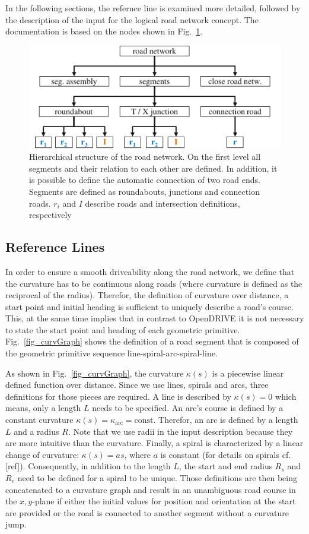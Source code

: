 \documentclass[a4paper, 10pt, conference]{ieeeconf}      %
\begin{document}
In the following sections, the refernce line is examined more detailed, followed by the description of the input for the logical road network concept. The documentation is based on the nodes shown in Fig.~\ref{fig_schema}. 
\begin{figure}[thpb] 		
	\centering
	\includegraphics{fig/schema.pdf}
	\caption{Hierarchical structure of the road network. On the first level all segments and their relation to each other are defined. In addition, it is possible to define the automatic connection of two road ends. Segments are defined as roundabouts, junctions and connection roads. $r_i$ and $I$ describe roads and intersection definitions, respectively}
	\label{fig_schema}
\end{figure}
\subsection{Reference Lines} %
In order to ensure a smooth driveability along the road network, we define that the curvature has to be continuous along roads (where curvature is defined as the reciprocal of the radius). Therefor, the definition of curvature over distance, a start point and initial heading is sufficient to uniquely describe a road's course. This, at the same time implies that in contrast to OpenDRIVE it is not necessary to state the start point and heading of each geometric primitive. Fig.~\ref{fig_curvGraph} shows the definition of a road segment that is composed of the geometric primitive sequence line-spiral-arc-spiral-line.

As shown in Fig.~\ref{fig_curvGraph}, the curvature $\kappa(s)$ is a piecewise linear defined function over distance. Since we use lines, spirals and arcs, three definitions for those pieces are required. A line is described by $\kappa(s) = 0$ which means, only a length $L$ needs to be specified. An arc's course is defined by a constant curvature $\kappa(s) = \kappa_\text{arc} = \text{const}$. Therefor, an arc is defined by a length $L$ and a radius $R$. Note that we use radii in the input description because they are more intuitive than the curvature. Finally, a spiral is characterized by a linear change of curvature: $\kappa(s) = a s$, where $a$ is constant (for details on spirals cf. [ref]). Consequently, in addition to the length $L$, the start and end radius $R_s$ and $R_e$ need to be defined for a spiral to be unique. Those definitions are then being concatenated to a curvature graph and result in an unambiguous road course in the $x,y$-plane if either the initial values for position and orientation at the start are provided or the road is connected to another segment without a curvature jump.
\end{document}
